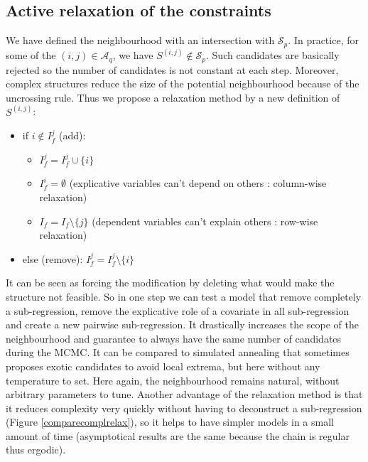 \documentclass[12pt,a4paper]{report}
\begin{document}
		\subsection{Active relaxation of the constraints}
		We have defined the neighbourhood with an intersection with $\mathcal{S}_p$. 
		In practice, for some of the $(i,j) \in \mathcal{A}_q$, we have $S^{(i,j)}\notin \mathcal{S}_p$. Such candidates are basically rejected so the number of candidates is not constant at each step. Moreover, complex structures reduce the size of the potential neighbourhood because of the uncrossing rule. 
		Thus we propose a relaxation method by a new definition of $S^{(i,j)}$:
	\begin{itemize}
		\item if $i \notin I_f^j$ (add): 
			\begin{itemize}
				\item $I_f^j=I_f^j\cup \{i\}$
				\item $I_f^i=\emptyset$ (explicative variables can't depend on others : column-wise relaxation)
				\item $I_f=I_f \setminus \{j\}$ (dependent variables can't explain others : row-wise relaxation) 
			\end{itemize}			 
		\item else (remove): $I_f^j=I_f^j\setminus \{i\}$
	\end{itemize}
	It can be seen as forcing the modification by deleting what would make the structure not feasible. So in one step we can test a model that remove completely a sub-regression, remove the explicative role of a covariate in all sub-regression and create a new pairwise sub-regression. It drastically increases the scope of the neighbourhood and guarantee to always have the same number of candidates during the MCMC. It can be compared to simulated annealing that sometimes proposes exotic candidates to avoid local extrema, but here without any temperature to set. Here again, the neighbourhood remains natural, without arbitrary parameters to tune. 
	Another advantage of the relaxation method is that it reduces complexity very quickly without having to deconstruct a sub-regression (Figure \ref{comparecomplrelax}), so it helps to have simpler models in a small amount of time (asymptotical results are the same because the chain is regular thus ergodic).
			
\end{document}

